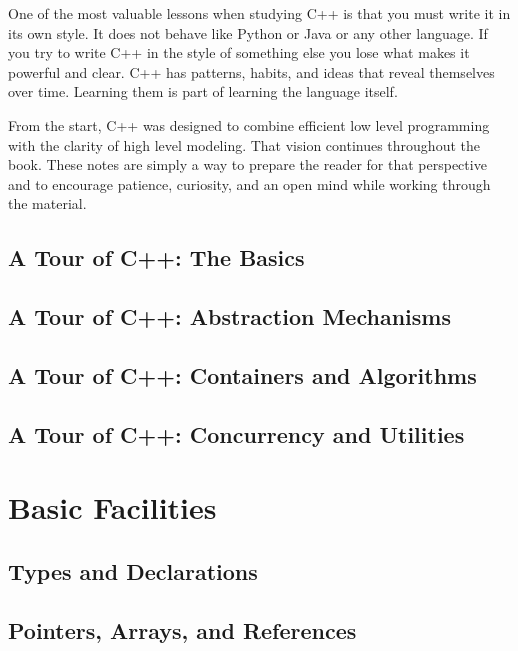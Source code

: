\documentclass[12pt,letterpaper]{book}
\theoremstyle{definition}
\theoremstyle{remark}
\begin{document}
One of the most valuable lessons when studying C++ is that you must write it in its own style. It does not behave like Python or Java or any other language. If you try to write C++ in the style of something else you lose what makes it powerful and clear. C++ has patterns, habits, and ideas that reveal themselves over time. Learning them is part of learning the language itself.

From the start, C++ was designed to combine efficient low level programming with the clarity of high level modeling. That vision continues throughout the book. These notes are simply a way to prepare the reader for that perspective and to encourage patience, curiosity, and an open mind while working through the material.

\chapter{A Tour of C++: The Basics}


\chapter{A Tour of C++: Abstraction Mechanisms}


\chapter{A Tour of C++: Containers and Algorithms}


\chapter{A Tour of C++: Concurrency and Utilities}


\part{Basic Facilities}

\chapter{Types and Declarations}


\chapter{Pointers, Arrays, and References}
\end{document}
